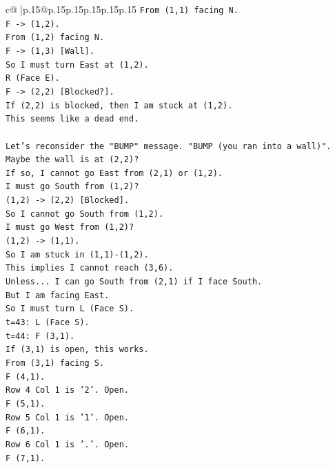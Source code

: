 \documentclass{article}
\begin{document}
{\begin{supertabular}{c@{$\;$}|p{.15\linewidth}@{}p{.15\linewidth}p{.15\linewidth}p{.15\linewidth}p{.15\linewidth}p{.15\linewidth}}
{{{\texttt{From (1,1) facing N.} \\
\texttt{F {-}> (1,2).} \\
\texttt{From (1,2) facing N.} \\
\texttt{F {-}> (1,3) {[}Wall{]}.} \\
\texttt{So I must turn East at (1,2).} \\
\texttt{R (Face E).} \\
\texttt{F {-}> (2,2) {[}Blocked?{]}.} \\
\texttt{If (2,2) is blocked, then I am stuck at (1,2).} \\
\texttt{This seems like a dead end.} \\
\\ 
\texttt{Let's reconsider the "BUMP" message. "BUMP (you ran into a wall)".} \\
\texttt{Maybe the wall is at (2,2)?} \\
\texttt{If so, I cannot go East from (2,1) or (1,2).} \\
\texttt{I must go South from (1,2)?} \\
\texttt{(1,2) {-}> (2,2) {[}Blocked{]}.} \\
\texttt{So I cannot go South from (1,2).} \\
\texttt{I must go West from (1,2)?} \\
\texttt{(1,2) {-}> (1,1).} \\
\texttt{So I am stuck in (1,1){-}(1,2).} \\
\texttt{This implies I cannot reach (3,6).} \\
\texttt{Unless... I can go South from (2,1) if I face South.} \\
\texttt{But I am facing East.} \\
\texttt{So I must turn L (Face S).} \\
\texttt{t=43: L (Face S).} \\
\texttt{t=44: F (3,1).} \\
\texttt{If (3,1) is open, this works.} \\
\texttt{From (3,1) facing S.} \\
\texttt{F (4,1).} \\
\texttt{Row 4 Col 1 is '2'. Open.} \\
\texttt{F (5,1).} \\
\texttt{Row 5 Col 1 is '1'. Open.} \\
\texttt{F (6,1).} \\
\texttt{Row 6 Col 1 is '.'. Open.} \\
\texttt{F (7,1).} \\
}}}
\end{supertabular}}
\end{document}
